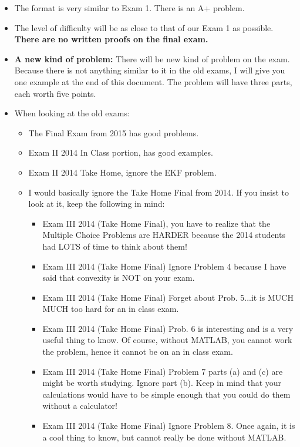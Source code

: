 \documentclass[letterpaper]{article}
\begin{document}
\begin{itemize}

\item The format is very similar to Exam 1.  There is an A+ problem.
\item The level of difficulty will be as close to that of our Exam 1 as possible. \textbf{There are no written proofs on the final exam.}

\item \textbf{A new kind of problem:} There will be new kind of problem on the exam. Because there is not anything similar to it in the old exams,  I will give you one example at the end of this document. The problem will have three parts, each worth five points. \\

    \item When looking at the old exams:
    \begin{itemize}
    \item The Final Exam from 2015 has good problems.
    \item  Exam II 2014 In Class portion, has good examples.
    \item  Exam II 2014 Take Home, ignore the EKF problem.
    \item I would basically ignore the Take Home Final from 2014. If you insist to look at it, keep the following in mind:
    \begin{itemize}
    \item  Exam III 2014 (Take Home Final), you have to realize that the Multiple Choice Problems are HARDER because the 2014 students had LOTS of time to think about them!
\item  Exam III 2014 (Take Home Final) Ignore Problem 4 because I have said that convexity is NOT on your exam.
\item  Exam III 2014 (Take Home Final) Forget about Prob. 5...it is MUCH MUCH too hard for an in class exam.
\item  Exam III 2014 (Take Home Final) Prob. 6 is interesting and is a very useful thing to know. Of course, without MATLAB, you cannot work the problem, hence it cannot be on an in class exam.
    \item  Exam III 2014 (Take Home Final) Problem 7 parts (a) and (c) are might be worth studying. Ignore part (b). Keep in mind that your calculations would have to be simple enough that you could do them without a calculator!
        \item  Exam III 2014 (Take Home Final)  Ignore Problem 8. Once again, it is a cool thing to know, but cannot really be done without MATLAB.

    \end{itemize}
     \end{itemize}


\end{itemize}
\end{document}
